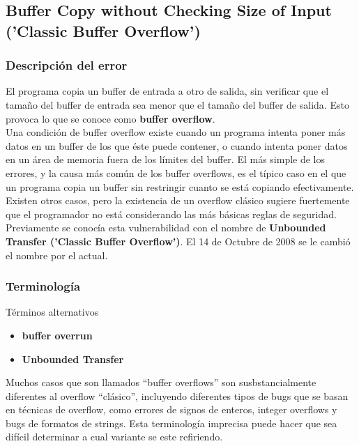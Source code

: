 \subsection{Buffer Copy without Checking Size of Input ('Classic Buffer Overflow')}

\subsubsection{Descripción del error}

El programa copia un buffer de entrada a otro de salida, sin verificar que el tamaño del buffer de entrada sea menor que el tamaño del buffer de salida. Esto provoca
lo que se conoce como \textbf{buffer overflow}.\\

Una condición de buffer overflow existe cuando un programa intenta poner más datos en un buffer de los que éste puede contener, o cuando intenta poner datos en un área de memoria
fuera de los límites del buffer. El más simple de los errores, y la causa más común de los buffer overflows, es el típico caso en el que un programa copia un buffer sin
restringir cuanto se está copiando efectivamente. Existen otros casos, pero la existencia de un overflow clásico sugiere fuertemente que el programador no está considerando
las más básicas reglas de seguridad. \\

Previamente se conocía esta vulnerabilidad con el nombre de \textbf{Unbounded Transfer ('Classic Buffer Overflow')}. El 14 de Octubre de 2008 se le cambió el nombre por el actual.

\subsubsection{Terminología}
Términos alternativos
\begin{itemize}
    \item \textbf{buffer overrun}
    \item \textbf{Unbounded Transfer}
\end{itemize}

Muchos casos que son llamados ``buffer overflows'' son susbstancialmente diferentes al overflow ``clásico'', incluyendo diferentes tipos de bugs que se basan en técnicas
de overflow, como errores de signos de enteros, integer overflows y bugs de formatos de strings. Esta terminología imprecisa puede hacer que sea difícil determinar a cual
variante se este refiriendo.


